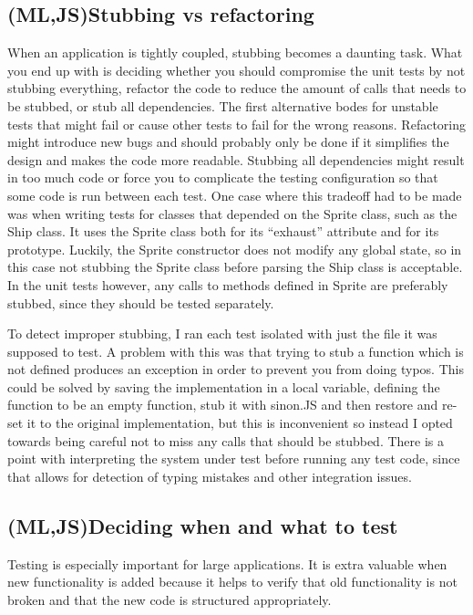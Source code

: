 \documentclass[11pt]{article}
\begin{document}
\subsection{(ML,JS)Stubbing vs refactoring}

When an application is tightly coupled, stubbing becomes a daunting task. What you end up with is deciding whether you should compromise the unit tests by not stubbing everything, refactor the code to reduce the amount of calls that needs to be stubbed, or stub all dependencies. The first alternative bodes for unstable tests that might fail or cause other tests to fail for the wrong reasons. Refactoring might introduce new bugs and should probably only be done if it simplifies the design and makes the code more readable. Stubbing all dependencies might result in too much code or force you to complicate the testing configuration so that some code is run between each test. One case where this tradeoff had to be made was when writing tests for classes that depended on the Sprite class, such as the Ship class. It uses the Sprite class both for its ``exhaust'' attribute and for its prototype. Luckily, the Sprite constructor does not modify any global state, so in this case not stubbing the Sprite class before parsing the Ship class is acceptable. In the unit tests however, any calls to methods defined in Sprite are preferably stubbed, since they should be tested separately.

To detect improper stubbing, I ran each test isolated with just the file it was supposed to test. A problem with this was that trying to stub a function which is not defined produces an exception in order to prevent you from doing typos. This could be solved by saving the implementation in a local variable, defining the function to be an empty function, stub it with sinon.JS and then restore and re-set it to the original implementation, but this is inconvenient so instead I opted towards being careful not to miss any calls that should be stubbed. There is a point with interpreting the system under test before running any test code, since that allows for detection of typing mistakes and other integration issues.

\subsection{(ML,JS)Deciding when and what to test}

Testing is especially important for large applications. It is extra valuable when new functionality is added because it helps to verify that old functionality is not broken and that the new code is structured appropriately. \cite[questions~6-7]{Stenmark}
\end{document}
